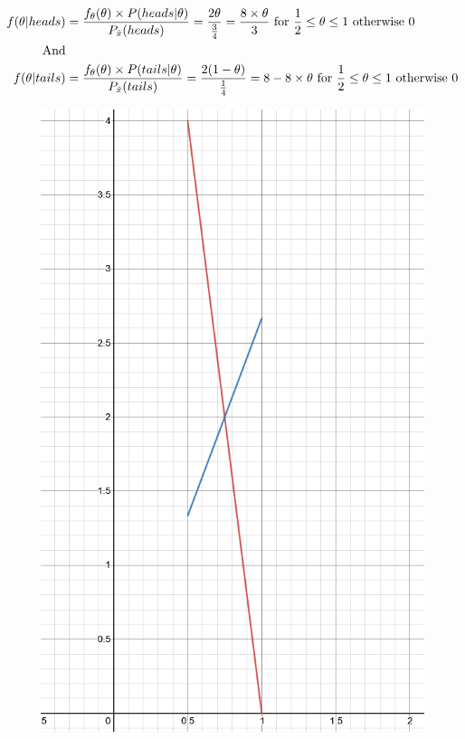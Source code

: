 \documentclass[12pt,twoside]{article}
\newcommand{\rnd}{\Tilde}
\newcommand{\rX}{\rnd{ x}  }
\begin{document}
\begin{enumerate}
\begin{enumerate}
\begin{equation}
    \begin{split}
        f(\theta|heads) &= \frac{f_\theta(\theta)\times P(heads|\theta)}{P_{\rX}(heads)} = \frac{2\theta}{\frac{3}{4}} = \frac{8\times \theta}{3} \text{ for }\frac{1}{2} \leq \theta \leq 1 \text{ otherwise } 0 \\
        \text{And} & \\
        f(\theta|tails) &= \frac{f_\theta(\theta)\times P(tails|\theta)}{P_{\rX}(tails)} = \frac{2(1-\theta)}{\frac{1}{4}} = 8-8\times\theta \text{ for }\frac{1}{2} \leq \theta \leq 1 \text{ otherwise } 0 \\
    \end{split}
\end{equation}
\begin{figure}[h!]
    \centering
    \includegraphics[scale=.4]{hw6 desmos 1.b.png}

\end{figure}
\end{enumerate}
\end{enumerate}
\end{document}

